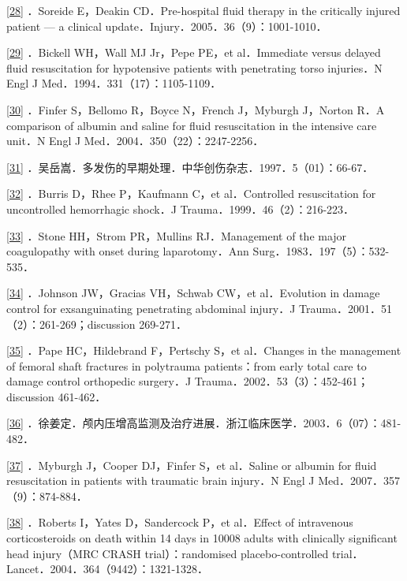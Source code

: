 \protect\hyperlink{text00024.htmlux5cux23ch28-23-back}{{[}28{]}}
．Soreide E，Deakin CD．Pre-hospital fluid therapy in the critically
injured patient --- a clinical
update．Injury．2005．36（9）：1001-1010．

\protect\hyperlink{text00024.htmlux5cux23ch29-23-back}{{[}29{]}}
．Bickell WH，Wall MJ Jr，Pepe PE，et al．Immediate versus delayed fluid
resuscitation for hypotensive patients with penetrating torso
injuries．N Engl J Med．1994．331（17）：1105-1109．

\protect\hyperlink{text00024.htmlux5cux23ch30-23-back}{{[}30{]}}
．Finfer S，Bellomo R，Boyce N，French J，Myburgh J，Norton R．A
comparison of albumin and saline for fluid resuscitation in the
intensive care unit．N Engl J Med．2004．350（22）：2247-2256．

\protect\hyperlink{text00024.htmlux5cux23ch31-23-back}{{[}31{]}}
．吴岳嵩．多发伤的早期处理．中华创伤杂志．1997．5（01）：66-67．

\protect\hyperlink{text00024.htmlux5cux23ch32-23-back}{{[}32{]}}
．Burris D，Rhee P，Kaufmann C，et al．Controlled resuscitation for
uncontrolled hemorrhagic shock．J Trauma．1999．46（2）：216-223．

\protect\hyperlink{text00024.htmlux5cux23ch33-23-back}{{[}33{]}} ．Stone
HH，Strom PR，Mullins RJ．Management of the major coagulopathy with
onset during laparotomy．Ann Surg．1983．197（5）：532-535．

\protect\hyperlink{text00024.htmlux5cux23ch34-23-back}{{[}34{]}}
．Johnson JW，Gracias VH，Schwab CW，et al．Evolution in damage control
for exsanguinating penetrating abdominal injury．J
Trauma．2001．51（2）：261-269；discussion 269-271．

\protect\hyperlink{text00024.htmlux5cux23ch35-23-back}{{[}35{]}} ．Pape
HC，Hildebrand F，Pertschy S，et al．Changes in the management of
femoral shaft fractures in polytrauma patients：from early total care to
damage control orthopedic surgery．J
Trauma．2002．53（3）：452-461；discussion 461-462．

\protect\hyperlink{text00024.htmlux5cux23ch36-23-back}{{[}36{]}}
．徐姜定．颅内压增高监测及治疗进展．浙江临床医学．2003．6（07）：481-482．

\protect\hyperlink{text00024.htmlux5cux23ch37-23-back}{{[}37{]}}
．Myburgh J，Cooper DJ，Finfer S，et al．Saline or albumin for fluid
resuscitation in patients with traumatic brain injury．N Engl J
Med．2007．357（9）：874-884．

\protect\hyperlink{text00024.htmlux5cux23ch38-23-back}{{[}38{]}}
．Roberts I，Yates D，Sandercock P，et al．Effect of intravenous
corticosteroids on death within 14 days in 10008 adults with clinically
significant head injury（MRC CRASH trial）：randomised
placebo-controlled trial．Lancet．2004．364（9442）：1321-1328．

